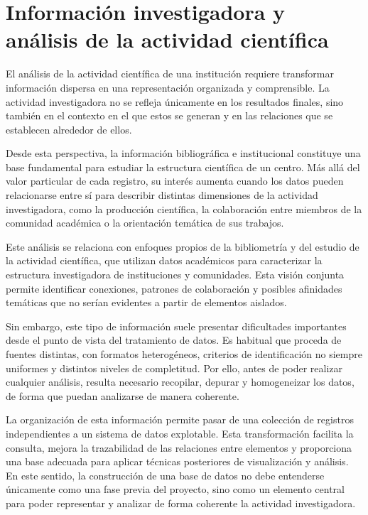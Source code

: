 \documentclass[11pt,spanish,listoffigures,listoftables]{tfgetsinf}
\begin{document}
\section{Información investigadora y análisis de la actividad científica}

El análisis de la actividad científica de una institución requiere transformar información dispersa en una representación organizada y comprensible. La actividad investigadora no se refleja únicamente en los resultados finales, sino también en el contexto en el que estos se generan y en las relaciones que se establecen alrededor de ellos.

Desde esta perspectiva, la información bibliográfica e institucional constituye una base fundamental para estudiar la estructura científica de un centro. Más allá del valor particular de cada registro, su interés aumenta cuando los datos pueden relacionarse entre sí para describir distintas dimensiones de la actividad investigadora, como la producción científica, la colaboración entre miembros de la comunidad académica o la orientación temática de sus trabajos.

Este análisis se relaciona con enfoques propios de la bibliometría y del estudio de la actividad científica, que utilizan datos académicos para caracterizar la estructura investigadora de instituciones y comunidades. Esta visión conjunta permite identificar conexiones, patrones de colaboración y posibles afinidades temáticas que no serían evidentes a partir de elementos aislados.

Sin embargo, este tipo de información suele presentar dificultades importantes desde el punto de vista del tratamiento de datos. Es habitual que proceda de fuentes distintas, con formatos heterogéneos, criterios de identificación no siempre uniformes y distintos niveles de completitud. Por ello, antes de poder realizar cualquier análisis, resulta necesario recopilar, depurar y homogeneizar los datos, de forma que puedan analizarse de manera coherente.

La organización de esta información permite pasar de una colección de registros independientes a un sistema de datos explotable. Esta transformación facilita la consulta, mejora la trazabilidad de las relaciones entre elementos y proporciona una base adecuada para aplicar técnicas posteriores de visualización y análisis. En este sentido, la construcción de una base de datos no debe entenderse únicamente como una fase previa del proyecto, sino como un elemento central para poder representar y analizar de forma coherente la actividad investigadora.
\end{document}
